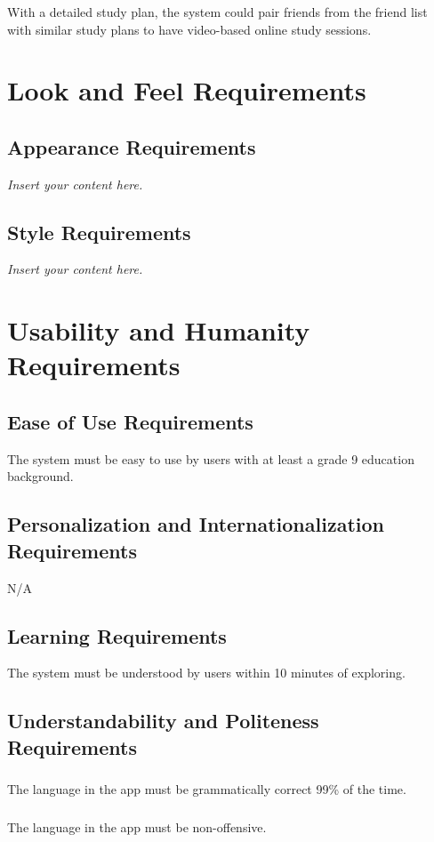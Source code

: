 \documentclass[12pt]{article}
\newcommand{\lips}{\textit{Insert your content here.}}
\begin{document}
\subsubsection{}
With a detailed study plan, the system could pair friends from the friend list with similar study plans to have video-based online study sessions.

\section{Look and Feel Requirements}
\subsection{Appearance Requirements}
\lips
\subsection{Style Requirements}
\lips

\section{Usability and Humanity Requirements}
\subsection{Ease of Use Requirements}
The system must be easy to use by users with at least a grade 9 education background.
\subsection{Personalization and Internationalization Requirements}
N/A
\subsection{Learning Requirements}
The system must be understood by users within 10 minutes of exploring.
\subsection{Understandability and Politeness Requirements}
\subsubsection{}
The language in the app must be grammatically correct 99\% of the time.
\subsubsection{}
The language in the app must be non-offensive.
\end{document}
